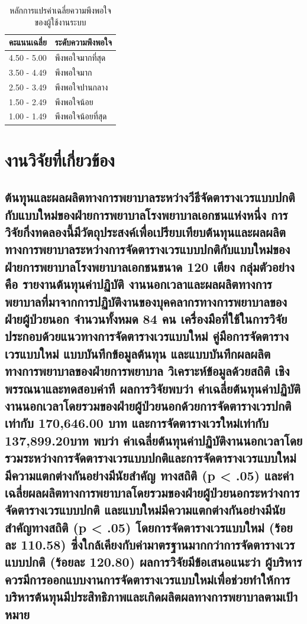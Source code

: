 \begin{table}[h]
    \captionsetup{justification=raggedright,singlelinecheck=false}
    \centering
    \fontsize{12}{20}\selectfont	
    \begin{tabular}{c l}
            \hline
            คะแนนเฉลี่ย  & ระดับความพึงพอใจ \\
            \hline
            4.50 - 5.00 & พึงพอใจมากที่สุด \\
            3.50 - 4.49 & พึงพอใจมาก \\
            2.50 - 3.49 & พึงพอใจปานกลาง \\
            1.50 - 2.49 & พึงพอใจน้อย \\
            1.00 - 1.49 & พึงพอใจน้อยที่สุด\\
            \hline
        \end{tabular}
    \caption{หลักการแปรค่าเฉลี่ยความพึงพอใจของผู้ใช้งานระบบ}
\end{table}

\renewcommand{\thesubsection}{\arabic{subsection}.}

\section{งานวิจัยที่เกี่ยวข้อง}

\vspace{0.25cm}


\hspace{0cm}\subsection{ต้นทุุนและผลผลิตทางการพยาบาลระหว่างวีธีจัดตารางเวรแบบปกติกับแบบใหม่ของฝ่ายการพยาบาลโรงพยาบาลเอกชนแห่งหนึ่ง การวิจัยกึ่งทดลองนี้มีวัตถุประสงค์เพื่อเปรียบเทียบต้นทุนและผลผลิตทางการพยาบาลระหว่างการจัดตารางเวรแบบปกติกับแบบใหม่ของฝ่ายการพยาบาลโรงพยาบาลเอกชนขนาด 120 เตียง กลุ่มตัวอย่าง คือ รายงานต้นทุนค่าปฏิบัติ งานนอกเวลาและผลผลิตทางการพยาบาลที่มาจากการปฏิบัติงานของบุคคลากรทางการพยาบาลของฝ่ายผู้ป่วยนอก จำนวนทั้งหมด 84 คน เครื่องมือที่ใช้ในการวิจัย ประกอบด้วยแนวทางการจัดตารางเวรแบบใหม่ คู่มือการจัดตารางเวรแบบใหม่ แบบบันทึกข้อมูลต้นทุน และแบบบันทึกผลผลิตทางการพยาบาลของฝ่ายการพยาบาล วิเคราะห์ข้อมูลด้วยสถิติ เชิงพรรณนาและทดสอบค่าที  ผลการวิจัยพบว่า ค่าเฉลี่ยต้นทุนค่าปฏิบัติงานนอกเวลาโดยรวมของฝ่ายผู้ป่วยนอกด้วยการจัดตารางเวรปกติเท่ากับ 170,646.00 บาท และการจัดตารางเวรใหม่เท่ากับ 137,899.20บาท พบว่า ค่าเฉลี่ยต้นทุนค่าปฏิบัติงานนอกเวลาโดยรวมระหว่างการจัดตารางเวรแบบปกติและการจัดตารางเวรแบบใหม่มีความแตกต่างกันอย่างมีนัยสำคัญ ทางสถิติ (p < .05) และค่าเฉลี่ยผลผลิตทางการพยาบาลโดยรวมของฝ่ายผู้ป่วยนอกระหว่างการจัดตารางเวรแบบปกติ และแบบใหม่มีความแตกต่างกันอย่างมีนัยสำคัญทางสถิติ (p < .05) โดยการจัดตารางเวรแบบใหม่ (ร้อยละ 110.58) ซึ่งใกล้เคียงกับค่ามาตรฐานมากกว่าการจัดตารางเวรแบบปกติ (ร้อยละ 120.80) ผลการวิจัยมีข้อเสนอแนะว่า ผู้บริหารควรมีการออกแบบงานการจัดตารางเวรแบบใหม่เพื่อช่วยทำให้การบริหารต้นทุนมีประสิทธิภาพและเกิดผลิตผลทางการพยาบาลตามเป้าหมาย \cite{vijai1}}

